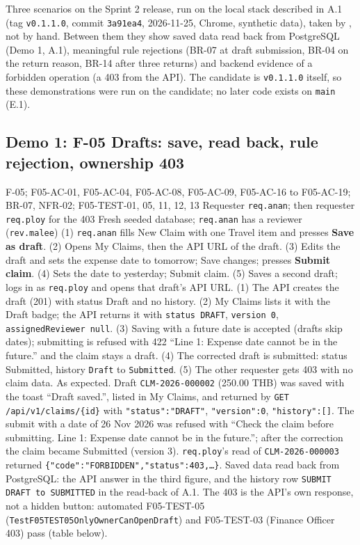 \label{B:3}

Three scenarios on the Sprint 2 release, run on the local stack described in A.1 (tag \texttt{v0.1.1.0}, commit \texttt{3a91ea4}, 2026-11-25, Chrome, synthetic data), taken by , not by hand.
Between them they show saved data read back from PostgreSQL (Demo 1, A.1), meaningful rule rejections (BR-07 at draft submission, BR-04 on the return reason, BR-14 after three returns) and backend evidence of a forbidden operation (a 403 from the API).
The candidate is \texttt{v0.1.1.0} itself, so these demonstrations were run on the candidate; no later code exists on \texttt{main} (E.1).

\subsection*{Demo 1: F-05 Drafts: save, read back, rule rejection, ownership 403}

\demofacts
 {F-05; F05-AC-01, F05-AC-04, F05-AC-08, F05-AC-09, F05-AC-16 to F05-AC-19; BR-07, NFR-02; F05-TEST-01, 05, 11, 12, 13}
 {Requester \texttt{req.anan}; then requester \texttt{req.ploy} for the 403}
 {Fresh seeded database; \texttt{req.anan} has a reviewer (\texttt{rev.malee})}
 {(1) \texttt{req.anan} fills New Claim with one Travel item and presses \textbf{Save as draft}. (2) Opens My Claims, then the API URL of the draft. (3) Edits the draft and sets the expense date to tomorrow; Save changes; presses \textbf{Submit claim}. (4) Sets the date to yesterday; Submit claim. (5) Saves a second draft; logs in as \texttt{req.ploy} and opens that draft's API URL.}
 {(1) The API creates the draft (201) with status Draft and no history. (2) My Claims lists it with the Draft badge; the API returns it with \texttt{status DRAFT}, \texttt{version 0}, \texttt{assignedReviewer null}. (3) Saving with a future date is accepted (drafts skip dates); submitting is refused with 422 ``Line 1: Expense date cannot be in the future.'' and the claim stays a draft. (4) The corrected draft is submitted: status Submitted, history \texttt{Draft} to \texttt{Submitted}. (5) The other requester gets 403 with no claim data.}
 {As expected. Draft \texttt{CLM-2026-000002} (250.00 THB) was saved with the toast ``Draft saved.'', listed in My Claims, and returned by \texttt{GET /api/v1/claims/\{id\}} with \texttt{"status":"DRAFT"}, \texttt{"version":0}, \texttt{"history":[]}. The submit with a date of 26 Nov 2026 was refused with ``Check the claim before submitting. Line 1: Expense date cannot be in the future.''; after the correction the claim became Submitted (version 3). \texttt{req.ploy}'s read of \texttt{CLM-2026-000003} returned \texttt{\{"code":"FORBIDDEN","status":403,\ldots\}}.}
 {Saved data read back from PostgreSQL: the API answer in the third figure, and the history row \texttt{SUBMIT DRAFT to SUBMITTED} in the read-back of A.1. The 403 is the API's own response, not a hidden button: automated F05-TEST-05 (\texttt{TestF05TEST05OnlyOwnerCanOpenDraft}) and F05-TEST-03 (Finance Officer 403) pass (table below).}

